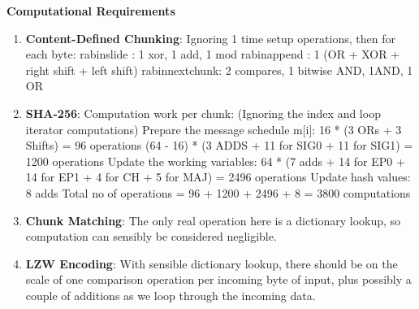 \documentclass{article}
\begin{document}
\item%
\textbf{Computational Requirements}
\begin{enumerate}[label=(\roman*)]
\item%
\textbf{Content-Defined Chunking}:\newline
Ignoring 1 time setup operations, then for each byte: rabinslide : 1 xor, 1 add, 1 mod rabinappend : 1 (OR
+ XOR + right shift + left shift) rabinnextchunk: 2 compares, 1 bitwise AND, 1AND, 1 OR

\item%
\textbf{SHA-256}:\newline
Computation work per chunk: (Ignoring the index and loop iterator computations)
Prepare the message schedule m[i]: 16 * (3 ORs + 3 Shifts) = 96 operations
 						      (64 - 16) * (3 ADDS + 11 for SIG0 + 11 for SIG1) = 1200 operations
Update the working variables: 64 * (7 adds + 14 for EP0 + 14 for EP1 + 4 for CH + 5 for MAJ) = 2496 operations
Update hash values: 8 adds
Total no of operations = 96 + 1200 + 2496 + 8 = 3800 computations

\item%
\textbf{Chunk Matching}:\newline
The only real operation here is a dictionary lookup, so computation can sensibly be considered negligible.

\item%
\textbf{LZW Encoding}:\newline
With sensible dictionary lookup, there should be on the scale of one comparison operation per incoming byte of input, plus possibly a couple of additions as we loop through the incoming data.


\end{enumerate}%
\end{document}
